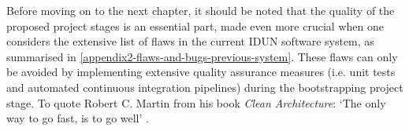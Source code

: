Before moving on to the next chapter, it should be noted that the quality of the proposed project stages is an essential part, made even more crucial when one considers the extensive list of flaws in the current IDUN software system, as summarised in \autoref{appendix2-flaws-and-bugs-previous-system}. These flaws can only be avoided by implementing extensive quality assurance measures (i.e. unit tests and automated continuous integration pipelines) during the bootstrapping project stage. To quote Robert C. Martin from his book \textit{Clean Architecture}: ‘The only way to go fast, is to go well’ \citep{martin_clean_2018}.

